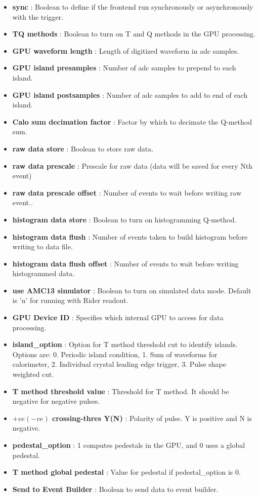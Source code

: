 \begin{itemize}
\item {\bf sync} : Boolean to define if the frontend run synchronously or asynchronously with the trigger.
\item {\bf TQ methods} : Boolean to turn on T and Q methods in the GPU processing.
\item {\bf GPU waveform length} : Length of digitized waveform in adc samples.
\item {\bf GPU island presamples} : Number of adc samples to prepend to each island.
\item {\bf GPU island postsamples} : Number of adc samples to add to end of each island.
\item {\bf Calo sum decimation factor} : Factor by which to decimate the Q-method sum.
\item {\bf raw data store} : Boolean to store raw data.
\item {\bf raw data prescale} : Prescale for raw data (data will be saved for every Nth event)
\item {\bf raw data prescale offset} : Number of events to wait before writing raw event..
\item {\bf histogram data store} : Boolean to turn on histogramming Q-method.
\item {\bf histogram data flush} : Number of events taken to build histogram before writing to data file.
\item {\bf histogram data flush offset} : Number of events to wait before writing histogrammed data.
\item {\bf use AMC13 simulator} : Boolean to turn on simulated data mode. Default is 'n' for running with Rider readout.
\item {\bf GPU Device ID} : Specifies which internal GPU to access for data processing. 
\item {\bf island\_option} : Option for T method threshold cut to identify islands. Options are: 0. Periodic island condition, 1. Sum of waveforms for calorimeter, 2. Individual crystal leading edge trigger, 3. Pulse shape weighted cut.
\item {\bf T method threshold value} : Threshold for T method. It should be negative for negative pulses.
\item {\bf $+ve(-ve)$ crossing-thres Y(N)} : Polarity of pulse. Y is positive and N is negative.
\item {\bf pedestal\_option} : 1 computes pedestals in the GPU, and 0 uses a global pedestal.
\item {\bf T method global pedestal} : Value for pedestal if pedestal\_option is 0. 
\item {\bf Send to Event Builder} : Boolean to send data to event builder.
\end{itemize}

